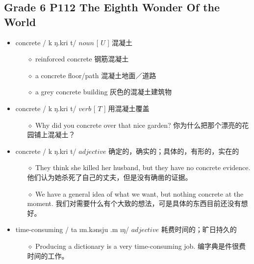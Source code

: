 \documentclass[a4paper,top=2.5cm,buttom=2.5cm10.5pt]{book}
\begin{document}
\textcolor[RGB]{128,0,255}{\section{Grade 6 P112 The Eighth Wonder Of the World}}
\begin{itemize}
\item concrete / \textprimstress k \textturnscripta ŋ.kri \textlengthmark t/ $ noun $ [  $ U $  ] 混凝土
\begin{itemize}
\item[$\diamond$] reinforced concrete
钢筋混凝土
\item[$\diamond$] a concrete floor/path
混凝土地面／道路
\item[$\diamond$] a grey concrete building
灰色的混凝土建筑物
\end{itemize}
\end{itemize}
\begin{itemize}
\item concrete / \textprimstress k \textturnscripta ŋ.kri \textlengthmark t/ $ verb $ [  $ T $  ] 用混凝土覆盖
\begin{itemize}
\item[$\diamond$] Why did you concrete over that nice garden?
你为什么把那个漂亮的花园铺上混凝土？
\end{itemize}
\end{itemize}
\begin{itemize}
\item concrete / \textprimstress k \textturnscripta ŋ.kri \textlengthmark t/ $ adjective $  确定的，确实的；具体的，有形的，实在的
\begin{itemize}
\item[$\diamond$] They think she killed her husband, but they have no concrete evidence.
他们认为她杀死了自己的丈夫，但是没有确凿的证据。
\item[$\diamond$] We have a general idea of what we want, but nothing concrete at the moment.
我们对需要什么有个大致的想法，可是具体的东西目前还没有想好。
\end{itemize}
\end{itemize}
\begin{itemize}
\item time-consuming / \textprimstress ta \i m.kən\textsecstress sju \textlengthmark .m \i ŋ/ $ adjective $  耗费时间的；旷日持久的
\begin{itemize}
\item[$\diamond$] Producing a dictionary is a very time-consuming job.
编字典是件很费时间的工作。
\end{itemize}
\end{itemize}
\end{document}
